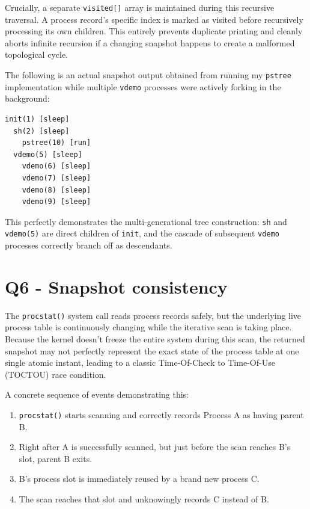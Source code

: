 \documentclass[11pt,a4paper]{article}
\begin{document}
Crucially, a separate \texttt{visited[]} array is maintained during this recursive traversal. A process record's specific index is marked as visited before recursively processing its own children. This entirely prevents duplicate printing and cleanly aborts infinite recursion if a changing snapshot happens to create a malformed topological cycle.

The following is an actual snapshot output obtained from running my \texttt{pstree} implementation while multiple \texttt{vdemo} processes were actively forking in the background:

\begin{verbatim}
init(1) [sleep]
  sh(2) [sleep]
    pstree(10) [run]
  vdemo(5) [sleep]
    vdemo(6) [sleep]
    vdemo(7) [sleep]
    vdemo(8) [sleep]
    vdemo(9) [sleep]
\end{verbatim}

This perfectly demonstrates the multi-generational tree construction: \texttt{sh} and \texttt{vdemo(5)} are direct children of \texttt{init}, and the cascade of subsequent \texttt{vdemo} processes correctly branch off as descendants.

\section*{Q6 - Snapshot consistency}

The \texttt{procstat()} system call reads process records safely, but the underlying live process table is continuously changing while the iterative scan is taking place. Because the kernel doesn't freeze the entire system during this scan, the returned snapshot may not perfectly represent the exact state of the process table at one single atomic instant, leading to a classic Time-Of-Check to Time-Of-Use (TOCTOU) race condition.

A concrete sequence of events demonstrating this:
\begin{enumerate}
    \item \texttt{procstat()} starts scanning and correctly records Process A as having parent B.
    \item Right after A is successfully scanned, but just before the scan reaches B's slot, parent B exits.
    \item B's process slot is immediately reused by a brand new process C.
    \item The scan reaches that slot and unknowingly records C instead of B.
\end{enumerate}
\end{document}
